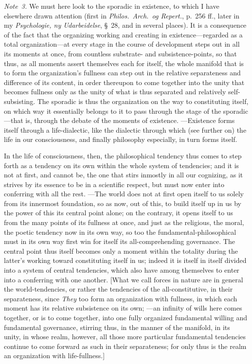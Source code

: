 \documentclass[12pt,a4paper]{book}
\begin{document}
{\small\emph{Note~3.} We must here look to the sporadic in existence, to which I have
elsewhere drawn attention (first in \textit{Philos.\ Arch.\ og Repert.}, p.~256 ff.,
later in my \textit{Psychologie, ny Udarbeidelse}, \S~28, and in several places). It
is a consequence of the fact that the organizing working and creating in
existence---regarded as a total organization---at every stage in the course of
development steps out in all its moments at once, from countless substrate- and
subsistence-points, so that thus, as all moments assert themselves each for itself,
the whole manifold that is to form the organization's fullness can step out in the
relative separateness and difference of its content, in order thereupon to come
together into the unity that becomes fullness only as the unity of what is thus
separated and relatively self-subsisting. The sporadic is thus the organization on
the way to constituting itself, on which way it essentially belongs to it to pass
through the stage of the sporadic---that is, through the debate of the moments of
existence. ---Existence forms itself through a life-dialectic, like the dialectic
through which (see further on) the life in our consciousness, and finally philosophy
especially, in turn forms itself.\par}

{\small In the life of consciousness, then, the philosophical tendency thus comes to
step forth as a tendency on its own within the whole system of tendencies; and it is
not at first, and cannot be, the one that stirs inmostly in all our cognizing, as it
strives by its essence to be in a scientific respect, but must now enter into
conferring with all the rest. ---The world does not at first open itself to us solely
from its innermost foundation, so as now, out of this, to build itself up in us by
the power of this its central point alone; on the contrary, it opens itself to us
from the many points of its fullness at once, and just as the religious, the moral,
the poetic tendency now in its own way, so too the fundamental-philosophical must in
its own way first win for itself its all-comprehending governance. The central point
thus itself becomes only a moment within the totality during the latter's working
toward constituting itself in us; indeed it is itself in itself divided into a system
of central tendencies, which also have among themselves to enter into a conferring
with one another. [What we call forces in nature are in general the world-tendencies,
or rather the tendencies of the all-constitutive, in their separateness, since
\emph{They} too form an organization with fullness, in which each moment has its
relative subsistence on its own; ---an infinity of wills here comes together, or is
to come together, into one fully organized fundamental willing and fundamental
governance, stirring thus, in the manner of the manifold, in its unity, in whose
realm, however, all those more particular fundamental tendencies continue to come
forward as such in their separateness; for only thus is the realm an organization
with life-fullness.]\par}
\end{document}
